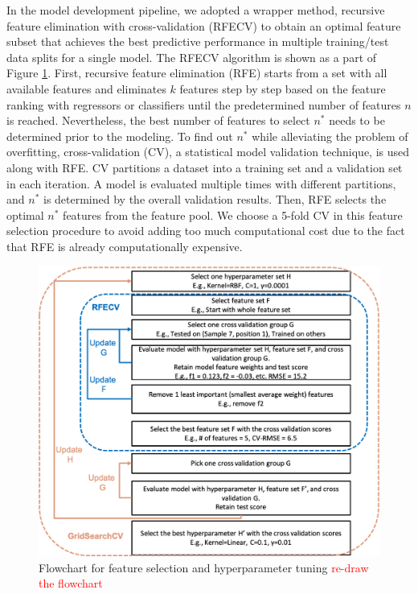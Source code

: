 In the model development pipeline, we adopted a wrapper method, recursive feature elimination with cross-validation (RFECV) to obtain an optimal feature subset that achieves the best predictive performance in multiple training/test data splits for a single model. The RFECV algorithm is shown as a part of Figure \ref{fig: rfecv logocv}. First, recursive feature elimination (RFE) starts from a set with all available features and eliminates $k$ features step by step based on the feature ranking with regressors or classifiers until the predetermined number of features $n$ is reached. Nevertheless, the best number of features to select $n^*$ needs to be determined prior to the modeling. To find out $n^*$ while alleviating the problem of overfitting, cross-validation (CV), a statistical model validation technique, is used along with RFE. CV partitions a dataset into a training set and a validation set in each iteration. A model is evaluated multiple times with different partitions, and $n^*$ is determined by the overall validation results. Then, RFE selects the optimal $n^*$ features from the feature pool. We choose a 5-fold CV in this feature selection procedure to avoid adding too much computational cost due to the fact that RFE is already computationally expensive.

\begin{figure}[tb]
    \centering
    \includegraphics[width=0.8\linewidth]{fig/rfecv.png}
    \caption{Flowchart for feature selection and hyperparameter tuning \textcolor{red}{re-draw the flowchart}}
    \label{fig: rfecv logocv}
\end{figure}

